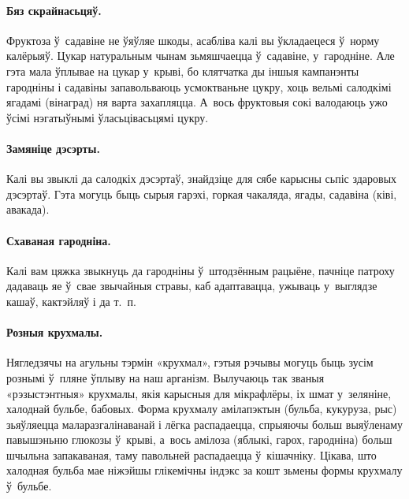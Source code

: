 \paragraph{Бяз скрайнасьцяў.}
Фруктоза ў~садавіне не ўяўляе шкоды, асабліва калі вы ўкладаецеся ў~норму калёрыяў. Цукар натуральным чынам зьмяшчаецца ў~садавіне, у~гародніне. Але гэта мала ўплывае на цукар у~крыві, бо клятчатка ды іншыя кампанэнты гародніны і садавіны запавольваюць усмоктваньне цукру, хоць вельмі салодкімі ягадамі (вінаград) ня варта захапляцца. А~вось фруктовыя сокі валодаюць ужо ўсімі нэгатыўнымі ўласьцівасьцямі цукру.

\paragraph{Замяніце дэсэрты.}
Калі вы звыклі да салодкіх дэсэртаў, знайдзіце для сябе карысны сьпіс здаровых дэсэртаў. Гэта могуць быць сырыя гарэхі, горкая чакаляда, ягады, садавіна (ківі, авакада).


\paragraph{Схаваная гародніна.}
Калі вам цяжка звыкнуць да гародніны ў~штодзённым рацыёне, пачніце патроху дадаваць яе ў~свае звычайныя стравы, каб адаптавацца, ужываць у~выглядзе кашаў, кактэйляў і да т.~п.

\paragraph{Розныя крухмалы.}
Нягледзячы на агульны тэрмін «крухмал», гэтыя рэчывы могуць быць зусім рознымі ў~пляне ўплыву на наш арганізм. Вылучаюць так званыя «рэзыстэнтныя» крухмалы, якія карысныя для мікрафлёры, іх шмат у~зеляніне, халоднай бульбе, бабовых. Форма крухмалу амілапэктын (бульба, кукуруза, рыс) зьяўляецца маларазгалінаванай і лёгка распадаецца, спрыяючы больш выяўленаму павышэньню глюкозы ў~крыві, а~вось амілоза (яблыкі, гарох, гародніна) больш шчыльна запакаваная, таму павольней распадаецца ў~кішачніку. Цікава, што халодная бульба мае ніжэйшы глікемічны індэкс за кошт зьмены формы крухмалу ў~бульбе.

